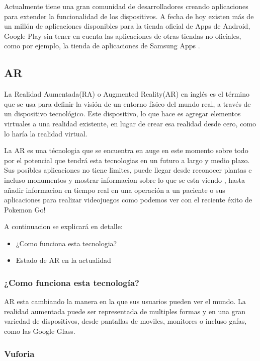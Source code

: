 Actualmente tiene una gran comunidad de desarrolladores creando aplicaciones para extender la funcionalidad de los dispositivos. A fecha de hoy existen más de un millón de aplicaciones disponibles para la tienda oficial de Apps de Android, Google Play \cite{URL::GooglePlay} sin tener en cuenta las aplicaciones de otras tiendas no oficiales, como por ejemplo, la tienda de aplicaciones de Samsung Apps \cite{URL::SamsungApps}.

\subsection{AR}

La Realidad Aumentada(RA) o Augmented Reality(AR) en inglés es el término que se usa para definir la visión de un entorno físico del mundo real, a través de un dispositivo tecnológico. Este dispositivo, lo que hace es agregar elementos virtuales a una realidad existente, en lugar de crear esa realidad desde cero, como lo haría la realidad
virtual. 

La AR es una técnologia que se encuentra en auge en este momento sobre todo por el potencial que tendrá esta tecnologias en un futuro a largo y medio plazo. Sus posibles aplicaciones no tiene limites, puede llegar desde reconocer plantas e incluso monumentos y mostrar informacion sobre lo que se esta viendo , hasta añadir informacion en tiempo real en una operación a un paciente o sus aplicaciones para realizar videojuegos como podemos ver con el reciente éxito de Pokemon Go!

A continuacion se explicará en detalle:
\begin{itemize}
\item ¿Como funciona esta tecnologia?
\item Estado de AR en la actualidad
\end{itemize}  

\subsubsection{¿Como funciona esta tecnología?}
	
 AR esta cambiando la manera en la que sus usuarios pueden ver el mundo. La realidad aumentada puede ser representada de multiples formas y en una gran variedad de dispositivos, desde pantallas de moviles, monitores o incluso gafas, como las Google Glass. 

\subsubsection{Vuforia}

